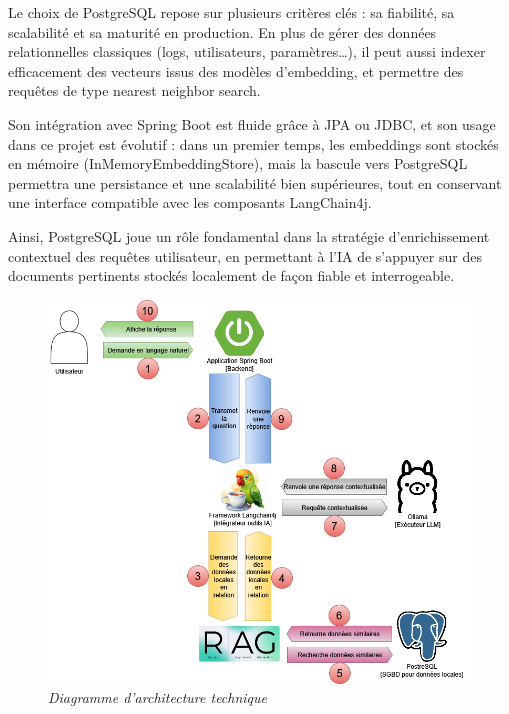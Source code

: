 \documentclass[12pt,a4paper]{report}
\begin{document}
\begin{itemize}
		Le choix de PostgreSQL repose sur plusieurs critères clés : sa fiabilité, sa scalabilité et sa maturité en production. En plus de gérer des données relationnelles classiques (logs, utilisateurs, paramètres…), il peut aussi indexer efficacement des vecteurs issus des modèles d’embedding, et permettre des requêtes de type nearest neighbor search.
		
		Son intégration avec Spring Boot est fluide grâce à JPA ou JDBC, et son usage dans ce projet est évolutif : dans un premier temps, les embeddings sont stockés en mémoire (InMemoryEmbeddingStore), mais la bascule vers PostgreSQL permettra une persistance et une scalabilité bien supérieures, tout en conservant une interface compatible avec les composants LangChain4j.
		
		Ainsi, PostgreSQL joue un rôle fondamental dans la stratégie d’enrichissement contextuel des requêtes utilisateur, en permettant à l’IA de s’appuyer sur des documents pertinents stockés localement de façon fiable et interrogeable.
		
	\end{itemize}
	
	\begin{figure}[H]
		\centering
		\includegraphics[width=1\textwidth]{illustration-graphique.drawio.png}
		\caption{\textit{Diagramme d'architecture technique}}
		\label{fig:illustration-graphique}
	\end{figure}
	
\end{document}
